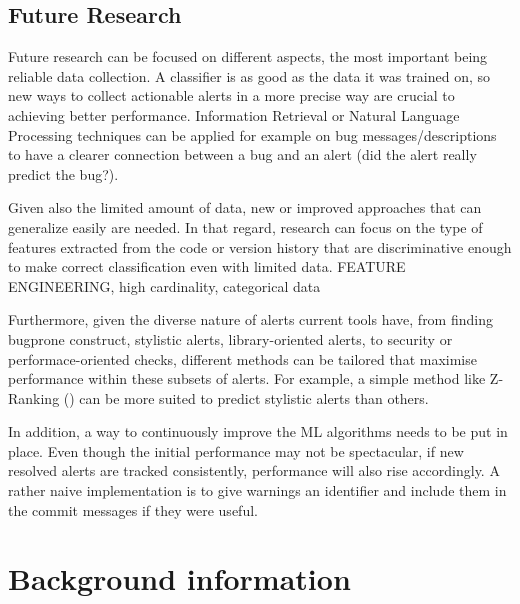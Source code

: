 \documentclass{article}
\begin{document}

\subsection{Future Research}

Future research can be focused on different aspects, the most important being reliable data collection. A classifier is as good as the data it was trained on, so new ways to collect actionable alerts in a more precise way are crucial to achieving better performance. Information Retrieval or Natural Language Processing techniques can be applied for example on bug messages/descriptions to have a clearer connection between a bug and an alert (did the alert really predict the bug?).

Given also the limited amount of data, new or improved approaches that can generalize easily are needed. In that regard, research can focus on the type of features extracted from the code or version history that are discriminative enough to make correct classification even with limited data. FEATURE ENGINEERING, high cardinality, categorical data

Furthermore, given the diverse nature of alerts current tools have, from finding bugprone construct, stylistic alerts, library-oriented alerts, to security or performace-oriented checks, different methods can be tailored that maximise performance within these subsets of alerts. For example, a simple method like Z-Ranking (\cite{z-ranking}) can be more suited to predict stylistic alerts than others.

In addition, a way to continuously improve the ML algorithms needs to be put in place. Even though the initial performance may not be spectacular, if new resolved alerts are tracked consistently, performance will also rise accordingly. A rather naive implementation is to give warnings an identifier and include them in the commit messages if they were useful.


\section{Background information}
\end{document}
